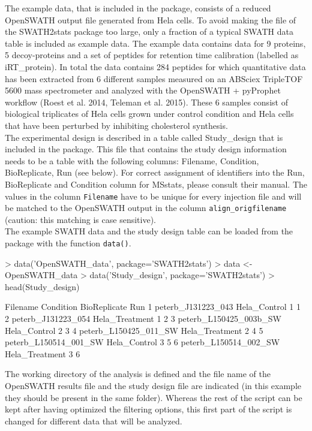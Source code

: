 \documentclass[a4paper]{article}
\begin{document}
The example data, that is included in the package, consists of a reduced OpenSWATH output file generated from Hela cells. To avoid making the file of the SWATH2stats package too large, only a fraction of a typical SWATH data table is included as example data. The example data contains data for 9 proteins, 5 decoy-proteins and a set of peptides for retention time calibration (labelled as iRT\_protein). In total the data contains 284 peptides for which quantitative data has been extracted from 6 different samples measured on an ABSciex TripleTOF 5600 mass spectrometer and analyzed with the OpenSWATH + pyProphet workflow (Roest et al. 2014, Teleman et al. 2015). These 6 samples consist of biological triplicates of Hela cells grown under control condition and Hela cells that have been perturbed by inhibiting cholesterol synthesis. \\
The experimental design is described in a table called Study\_design that is included in the package. This file that contains the study design information needs to be a table with the following columns:  Filename, Condition, BioReplicate, Run (see below). For correct assignment of identifiers into the Run, BioReplicate and Condition column for MSstats, please consult their manual. The values in the column \texttt{Filename} have to be unique for every injection file and will be matched to the OpenSWATH output in the column \texttt{align\_origfilename} (caution: this matching is case sensitive).\\
The example SWATH data and the study design table can be loaded from the package with the function \texttt{data()}.

\begin{Schunk}
\begin{Sinput}
> data('OpenSWATH_data', package='SWATH2stats')
> data <- OpenSWATH_data
> data('Study_design', package='SWATH2stats')
> head(Study_design)
\end{Sinput}
\begin{Soutput}
                Filename      Condition BioReplicate Run
1     peterb_J131223_043   Hela_Control            1   1
2     peterb_J131223_054 Hela_Treatment            1   2
3 peterb_L150425_003b_SW   Hela_Control            2   3
4  peterb_L150425_011_SW Hela_Treatment            2   4
5  peterb_L150514_001_SW   Hela_Control            3   5
6  peterb_L150514_002_SW Hela_Treatment            3   6
\end{Soutput}
\end{Schunk}

The working directory of the analysis is defined and the file name of the OpenSWATH results file and the study design file are indicated (in this example they should be present in the same folder). Whereas the rest of the script can be kept after having optimized the filtering options, this first part of the script is changed for different data that will be analyzed.
\end{document}
